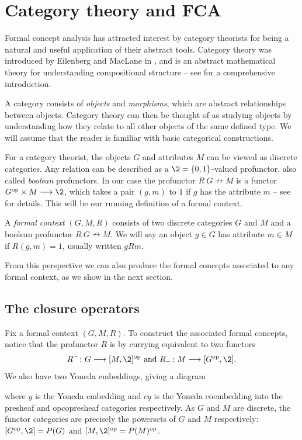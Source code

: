 

\section{Category theory and FCA}

Formal concept analysis has attracted interest by category theorists for being a natural and useful application of their abstract tools. Category theory was introduced by Eilenberg and MacLane in \cite{eilenberg-maclane_1945}, and is an abstract mathematical theory for understanding compositional structure -- see \cite{maclane_1998} for a comprehensive introduction. 

A category consists of \emph{objects} and \emph{morphisms}, which are abstract relationships between objects. Category theory can then be thought of as studying objects by understanding how they relate to all other objects of the same defined type. We will assume that the reader is familiar with basic categorical constructions. 

For a category theorist, the objects $G$ and attributes $M$ can be viewed as discrete categories. Any relation can be described as a $\2 = \{0,1\}$-valued profunctor, also called \emph{boolean} profunctors. In our case the profunctor $R\: G\nrightarrow M$ is a functor $G\op\times M\to \2$, which takes a pair $(g,m)$ to $1$ if $g$ has the attribute $m$ -- see \cite{ferrer_2023} for details. This will be our running definition of a formal context. 

\begin{definition}
    A \emph{formal context} $(G,M,R)$ consists of two discrete categories $G$ and $M$ and a boolean profunctor $R\: G\nrightarrow M$. We will say an object $g\in G$ has attribute $m\in M$ if $R(g,m)=1$, usually written $gRm$. 
\end{definition}

From this perspective we can also produce the formal concepts associated to any formal context, as we show in the next section.

\subsection{The closure operators}

Fix a formal context $(G,M,R)$. To construct the associated formal concepts, notice that the profunctor $R$ is by currying equivalent to two functors 
\[R^{-}\: G \to [M, \2]\op \text{ and } R_{-}\: M \to [G\op, \2].\]
We also have two Yoneda embeddings, giving a diagram
\begin{center}
\end{center}
where $y$ is the Yoneda embedding and $cy$ is the Yoneda coembedding into the presheaf and opcopresheaf categories respectively. As $G$ and $M$ are discrete, the functor categories are precisely the powersets of $G$ and $M$ respectively: $[G\op, \2] = P(G)$ and $[M, \2]\op = P(M)\op$. 

